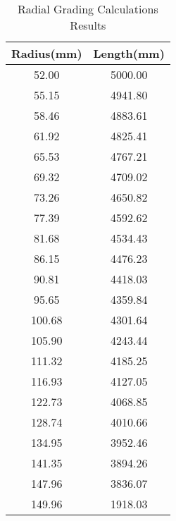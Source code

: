 \begin{table}[!htb]
\caption{Radial Grading Calculations Results}
\label{table:radialvals}
\begin{center}
\begin{tabular}{cc}
\toprule
\textbf{Radius(mm)} & \textbf{Length(mm)} \\ \toprule
52.00 & 5000.00 \\
55.15 & 4941.80 \\
58.46 & 4883.61 \\
61.92 & 4825.41 \\
65.53 & 4767.21 \\
69.32 & 4709.02 \\
73.26 & 4650.82 \\
77.39 & 4592.62 \\
81.68 & 4534.43 \\
86.15 & 4476.23 \\
90.81 & 4418.03 \\
95.65 & 4359.84 \\
100.68 & 4301.64 \\
105.90 & 4243.44 \\
111.32 & 4185.25 \\
116.93 & 4127.05 \\
122.73 & 4068.85 \\
128.74 & 4010.66 \\
134.95 & 3952.46 \\
141.35 & 3894.26 \\
147.96 & 3836.07 \\
149.96 & 1918.03 \\
\bottomrule
\end{tabular}
\end{center}
\end{table}
